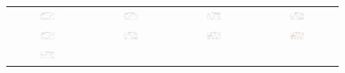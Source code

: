 \begin{figure}[ht]
  \centering
  \begin{tabular}{cccc}
    \includegraphics[width=0.23\textwidth]{images/gnn_obs_no_pos_j1_jj1_0.png} &
    \includegraphics[width=0.23\textwidth]{images/gnn_obs_no_pos_j1_jj2_0.png} &
    \includegraphics[width=0.23\textwidth]{images/gnn_obs_no_pos_j1_jj3_0.png} &
    \includegraphics[width=0.23\textwidth]{images/gnn_obs_no_pos_j1_jj4_0.png} \\
    \includegraphics[width=0.23\textwidth]{images/gnn_obs_no_pos_j2_jj1_0.png} &
    \includegraphics[width=0.23\textwidth]{images/gnn_obs_no_pos_j2_jj2_0.png} &
    \includegraphics[width=0.23\textwidth]{images/gnn_obs_no_pos_j2_jj3_0.png} &
    \includegraphics[width=0.23\textwidth]{images/gnn_obs_no_pos_j2_jj4_0.png} \\
    \includegraphics[width=0.23\textwidth]{images/gnn_obs_no_pos_j3_jj1_0.png} &

\end{tabular}
\end{figure}
